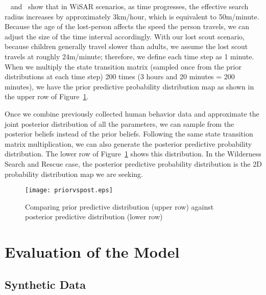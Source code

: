 ~\cite{Setnicka1980Wilderness} and~\cite{Syrotuck2000Introduction} show that in WiSAR scenarios, as time progresses, the effective search radius increases by approximately 3km/hour, which is equivalent to 50m/minute. Because the age of the lost-person affects the speed the person travels, we can adjust the size of the time interval accordingly. With our lost scout scenario, because children generally travel slower than adults, we assume the lost scout travels at roughly 24m/minute; therefore, we define each time step as 1 minute. When we multiply the state transition matrix (sampled once from the prior distributions at each time step) 200 times (3 hours and 20 minutes = 200 minutes), we have the prior predictive probability distribution map as shown in the upper row of Figure~\ref{priorvspost}.

Once we combine previously collected human behavior data and approximate the joint posterior distribution of all the parameters, we can sample from the posterior beliefs instead of the prior beliefs. Following the same state transition matrix multiplication, we can also generate the posterior predictive probability distribution. The lower row of Figure~\ref{priorvspost} shows this distribution. In the Wilderness Search and Rescue case, the posterior predictive probability distribution is the 2D probability distribution map we are seeking.

\begin{figure}
\centering
\texttt{[image: priorvspost.eps]}
\caption[Comparing prior predictive distribution against posterior predictive distribution]{Comparing prior predictive distribution (upper row) against posterior predictive distribution (lower row)}
\label{priorvspost}
\end{figure}

\section{Evaluation of the Model}
\label{sec:4}

\subsection{Synthetic Data}
\label{sec:4.1}

